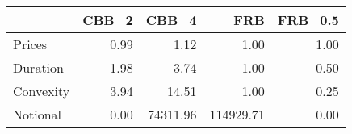 \begin{tabular}{lrrrr}
\toprule
{} &  CBB\_2 &     CBB\_4 &        FRB &  FRB\_0.5 \\
\midrule
Prices    &   0.99 &      1.12 &       1.00 &     1.00 \\
Duration  &   1.98 &      3.74 &       1.00 &     0.50 \\
Convexity &   3.94 &     14.51 &       1.00 &     0.25 \\
Notional  &   0.00 &  74311.96 &  114929.71 &     0.00 \\
\bottomrule
\end{tabular}
